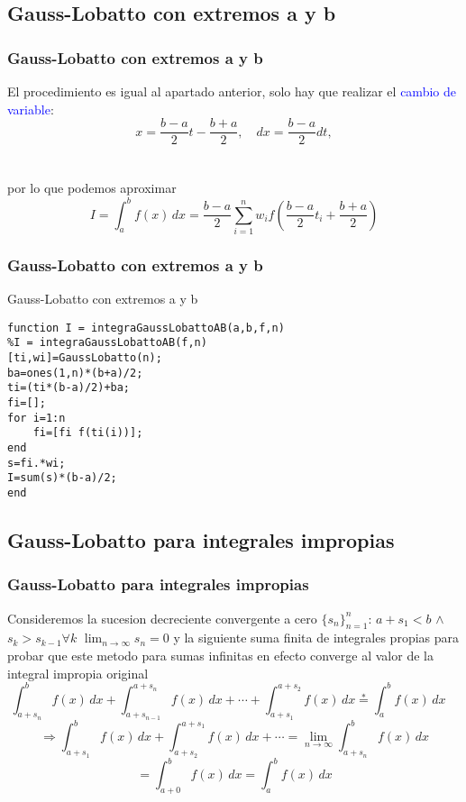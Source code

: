 \documentclass{beamer}
\begin{document}
\subsection{Gauss-Lobatto con extremos a y b}
\begin{frame}
\frametitle{Gauss-Lobatto con extremos a y b}
El procedimiento es igual al apartado anterior, solo hay que realizar el \textcolor{blue}{cambio de variable}:
\[x=\frac{b-a}{2}t-\frac{b+a}{2},\quad dx=\frac{b-a}{2}dt,\]
\\~\\
por lo que podemos aproximar
\[\displaystyle I=\int_{a}^{b} \! f(x)  \,dx = \frac{b-a}{2} \sum_{i=1}^{n}w_i f \left(\frac{b-a}{2}t_i + \frac{b+a}{2} \right)\]
\end{frame}


\begin{frame}[fragile] %
\frametitle{Gauss-Lobatto con extremos a y b}
\begin{exampleblock}{Gauss-Lobatto con extremos a y b}
\begin{verbatim}
function I = integraGaussLobattoAB(a,b,f,n)
%I = integraGaussLobattoAB(f,n)
[ti,wi]=GaussLobatto(n);
ba=ones(1,n)*(b+a)/2;
ti=(ti*(b-a)/2)+ba;
fi=[];
for i=1:n
    fi=[fi f(ti(i))];
end
s=fi.*wi;
I=sum(s)*(b-a)/2;
end\end{verbatim}
\end{exampleblock}
\end{frame}



\subsection{Gauss-Lobatto para integrales impropias}
\begin{frame}
\frametitle{Gauss-Lobatto para integrales impropias}
Consideremos la sucesion decreciente convergente a cero $\{s_n\}_{n=1}^n$: $a+s_1<b$ $\wedge$ \stackrel{*} $s_k > s_{k-1} \forall k$ \wedge $\lim_{n \rightarrow \infty} s_n = 0$
y la siguiente suma finita de integrales propias para probar que este metodo para sumas infinitas en efecto converge al valor de
la integral impropia original
$$
\int_{a + s_n}^b f(x) \, dx + \int_{a + s_{n-1}}^{a + s_n} f(x) \, dx + \cdots + \int_{a + s_1}^{a + s_2} f(x) \, dx \stackrel{*}= \int_a^b f(x) \, dx \quad $$
$$\Rightarrow \int_{a + s_1}^b f(x) \, dx + \int_{a + s_2}^{a + s_1} f(x) \, dx + \cdots = \lim_{n \rightarrow \infty} \int_{a + s_n}^b f(x) \, dx $$$$ =\int_{a + 0}^b f(x) \, dx = \int_a^b f(x) \, dx$$
\\~\\
\end{frame}
\end{document}

